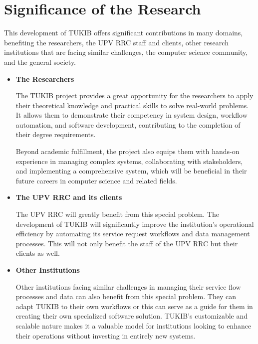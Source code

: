 \section{Significance of the Research}
\label{sec:significance}

This development of TUKIB offers significant contributions in many domains, benefiting the researchers, the UPV RRC staff and clients, other research institutions that are facing similar challenges, the computer science community, and the general society.

\begin{itemize}
	
\item \textbf{The Researchers}

\subitem The TUKIB project provides a great opportunity for the researchers to apply their theoretical knowledge and practical skills to solve real-world problems. It allows them to demonstrate their competency in system design, workflow automation, and software development, contributing to the completion of their degree requirements.

\subitem Beyond academic fulfillment, the project also equips them with hands-on experience in managing complex systems, collaborating with stakeholders, and implementing a comprehensive system, which will be beneficial in their future careers in computer science and related fields.\newline

\item \textbf{The UPV RRC and its clients}

\subitem The UPV RRC will greatly benefit from this special problem. The development of TUKIB will significantly improve the institution's operational efficiency by automating its service request workflows and data management processes. This will not only benefit the staff of the UPV RRC but their clients as well.\newline

\item \textbf{Other Institutions}

\subitem Other institutions facing similar challenges in managing their service flow processes and data can also benefit from this special problem. They can adapt TUKIB to their own workflows or this can serve as a guide for them in creating their own specialized software solution. TUKIB’s customizable and scalable nature makes it a valuable model for institutions looking to enhance their operations without investing in entirely new systems.\newline


\end{itemize}
